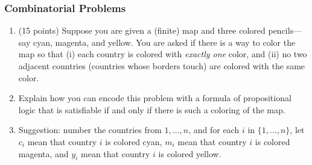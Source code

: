 \documentclass[english]{article}
\theoremstyle{definition}
\begin{document}
\subsubsection{Combinatorial Problems}
\begin{enumerate}[label=\arabic*.,ref=\arabic*,resume]
\item (15 points) Suppose you are given a (finite) map and three colored pencils---say cyan, magenta, and yellow. You are asked if there is a way to color the map so that (i) each country is colored with \textit{exactly one} color, and (ii) no two adjacent countries (countries whose borders touch) are colored with the same color. 
\item[] Explain how you can encode this problem with a formula of propositional logic that is satisfiable if and only if there is such a coloring of the map. 
\item[] Suggestion: number the countries from $1,\dots, n$, and for each $i$ in  $\{1,\dots,n\}$, let $c_i$ mean that country $i$ is colored cyan,  $m_i$ mean that country $i$ is colored magenta, and $y_i$ mean that country $i$ is colored yellow.
\end{enumerate}
\end{document}
